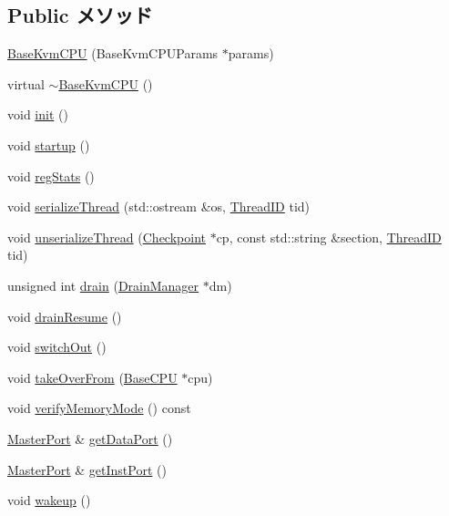 \subsection*{Public メソッド}
\begin{DoxyCompactItemize}
\item 
\hyperlink{classBaseKvmCPU_a9eb0b030bd0367a335c97b465d98f01c}{BaseKvmCPU} (BaseKvmCPUParams $\ast$params)
\item 
virtual \hyperlink{classBaseKvmCPU_abd186de5de7d9b8e90d2c1f08daf1ecd}{$\sim$BaseKvmCPU} ()
\item 
void \hyperlink{classBaseKvmCPU_a02fd73d861ef2e4aabb38c0c9ff82947}{init} ()
\item 
void \hyperlink{classBaseKvmCPU_aecc7d8debf54990ffeaaed5bac7d7d81}{startup} ()
\item 
void \hyperlink{classBaseKvmCPU_a4dc637449366fcdfc4e764cdf12d9b11}{regStats} ()
\item 
void \hyperlink{classBaseKvmCPU_a688ca491f5419c29fb81f8235ba1dc13}{serializeThread} (std::ostream \&os, \hyperlink{base_2types_8hh_ab39b1a4f9dad884694c7a74ed69e6a6b}{ThreadID} tid)
\item 
void \hyperlink{classBaseKvmCPU_a5122e6d6fdbdb3cb9ba72ae970f00a9e}{unserializeThread} (\hyperlink{classCheckpoint}{Checkpoint} $\ast$cp, const std::string \&section, \hyperlink{base_2types_8hh_ab39b1a4f9dad884694c7a74ed69e6a6b}{ThreadID} tid)
\item 
unsigned int \hyperlink{classBaseKvmCPU_aa8a18d230dba7a674ac8a0b4f35bc36a}{drain} (\hyperlink{classDrainManager}{DrainManager} $\ast$dm)
\item 
void \hyperlink{classBaseKvmCPU_a8f020d3237536fe007fc488c4125c5d8}{drainResume} ()
\item 
void \hyperlink{classBaseKvmCPU_a05f299b443f8cc73a93d61572edc0218}{switchOut} ()
\item 
void \hyperlink{classBaseKvmCPU_a6ab19fbe58a682743f9e652e9777fdac}{takeOverFrom} (\hyperlink{classBaseCPU_1_1BaseCPU}{BaseCPU} $\ast$cpu)
\item 
void \hyperlink{classBaseKvmCPU_ae2e1ccebe596a180f8105d57f9a93645}{verifyMemoryMode} () const 
\item 
\hyperlink{classMasterPort}{MasterPort} \& \hyperlink{classBaseKvmCPU_a041a57fcad534c1bed3702a0f8f3a6b1}{getDataPort} ()
\item 
\hyperlink{classMasterPort}{MasterPort} \& \hyperlink{classBaseKvmCPU_ab8ce6baf7cb0aaaf4ca346896a86fa03}{getInstPort} ()
\item 
void \hyperlink{classBaseKvmCPU_ae674290a26ecbd622c5160e38e8a4fe9}{wakeup} ()

\end{DoxyCompactItemize}

